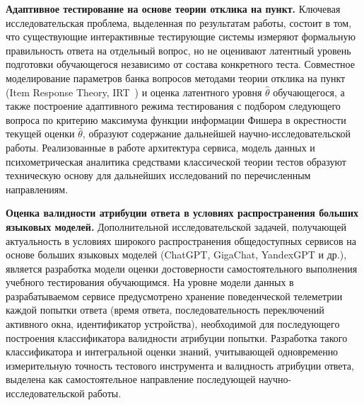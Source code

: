 \textbf{Адаптивное тестирование на основе теории отклика на пункт.}
Ключевая исследовательская проблема, выделенная по результатам
работы, состоит в том, что существующие интерактивные тестирующие
системы измеряют формальную правильность ответа на отдельный
вопрос, но не оценивают латентный уровень подготовки обучающегося
независимо от состава конкретного теста. Совместное моделирование
параметров банка вопросов методами теории отклика на пункт
(Item Response Theory, IRT~\cite{crocker_algina}) и оценка
латентного уровня $\hat{\theta}$ обучающегося, а также построение
адаптивного режима тестирования с подбором следующего вопроса
по критерию максимума функции информации Фишера в окрестности
текущей оценки $\hat{\theta}$, образуют содержание дальнейшей
научно-исследовательской работы. Реализованные в работе архитектура
сервиса, модель данных и психометрическая аналитика средствами
классической теории тестов образуют техническую основу для
дальнейших исследований по перечисленным направлениям.

\textbf{Оценка валидности атрибуции ответа в условиях распространения
больших языковых моделей.} Дополнительной исследовательской задачей,
получающей актуальность в условиях широкого распространения
общедоступных сервисов на основе больших языковых моделей
(ChatGPT, GigaChat, YandexGPT и др.), является разработка модели
оценки достоверности самостоятельного выполнения учебного
тестирования обучающимся. На уровне модели данных в разрабатываемом
сервисе предусмотрено хранение поведенческой телеметрии каждой
попытки ответа (время ответа, последовательность переключений
активного окна, идентификатор устройства), необходимой для
последующего построения классификатора валидности атрибуции
попытки. Разработка такого классификатора и интегральной оценки
знаний, учитывающей одновременно измерительную точность тестового
инструмента и валидность атрибуции ответа, выделена
как самостоятельное направление последующей научно-исследовательской
работы.

